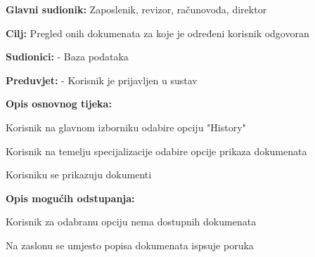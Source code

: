 					\noindent {}
						\begin{packed_item}
		
							\item \textbf{Glavni sudionik:} Zaposlenik, revizor, računovođa, direktor
							\item  \textbf{Cilj:} Pregled onih dokumenata za koje je određeni korisnik odgovoran
							\item  \textbf{Sudionici:} - Baza podataka
							\item  \textbf{Preduvjet:} - Korisnik je prijavljen u sustav
							\item  \textbf{Opis osnovnog tijeka:}
							
							\item[] \begin{packed_enum}
								\item Korisnik na glavnom izborniku odabire opciju "History"
								\item Korisnik na temelju specijalizacije odabire opcije prikaza dokumenata
								\item Korisniku se prikazuju dokumenti
							\end{packed_enum}
							
							\item  \textbf{Opis mogućih odstupanja:}
							
							\item[] \begin{packed_item}
		
								\item[3.a]Korisnik za odabranu opciju nema dostupnih dokumenata
								\item[] \begin{packed_enum}
									\item Na zaslonu se umjesto popisa dokumenata ispsuje poruka
								\end{packed_enum}
							\end{packed_item}
						\end{packed_item}

